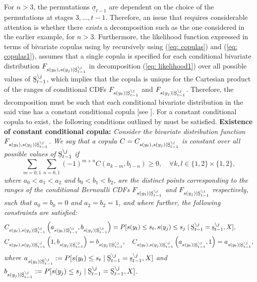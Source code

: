 \documentclass[harvard,11pt]{article}
\begin{document}
For $n>3$, the permutations $\underline{\sigma}_{t-1}$ are dependent on the choice of the permutations at stages $3,...,t-1$. Therefore, an issue that requires considerable attention is whether there \textit{exists} a decomposition such as the one considered in the earlier example, for $n>3$. Furthermore, the likelihood function expressed in terms of bivariate copulas using by recursively using (\ref{eq: copulas}) and (\ref{eq: copulas1}), assumes that a single copula is specified for each conditional bivariate distribution $F_{s(y_t),s(y_j)\mid \text{\b{S}}_{t-1}^{\backslash j}}$ in decomposition (\ref{eq: likelihood1}) over all possible values of $\text{\b{S}}_{t-1}^{\backslash j}$, which implies that the copula is unique for the Cartesian product of the ranges of conditional CDFs $F_{s(y_t)\mid \text{\b{S}}_{t-1}^{\backslash j}}$ and $F_{s(y_j)\mid \text{\b{S}}_{t-1}^{\backslash j}}$. Therefore, the decomposition must be such that each conditional bivariate distribution in the said vine has a constant conditional copula [see \citet{panagiotelis2012pair}]. For a constant conditional copula to exist, the following conditions outlined by \citet{panagiotelis2012pair} must be satisfied.
\newline
\noindent\textbf{Existence of constant conditional copula:} \textit{Consider the bivariate distribution function $F_{s(y_t),s(y_j)\mid \text{\b{S}}_{t-1}^{\backslash j}}$. We say that a copula $C=C_{s(y_t),s(y_j)\mid\text{\b{S}}_{t-1}^{\backslash j}}$ is constant over all possible values of $\text{\b{S}}_{t-1}^{\backslash j}$ if}
\[
\sum\limits_{m=0,1}\sum\limits_{n=0,1}(-1)^{m+n}C(a_{k-m},b_{l-n})\geq 0,\quad \forall k,l\in\{1,2\}\times\{1,2\},
\] 
\textit{where $a_0<a_1<a_2$ and $b_0<b_1<b_2$, are the distinct points corresponding to the ranges of the conditional Bernoulli CDFs $F_{s(y_t)\mid \text{\b{S}}_{t-1}^{\backslash j}}$ and $F_{s(y_j)\mid \text{\b{S}}_{t-1}^{\backslash j}}$ respectively, such that $a_0=b_0=0$ and $a_{2}=b_{2}=1$, and where further, the following constraints are satisfied:}
\begingroup
\allowdisplaybreaks
\begin{align*}
&C_{s(y_t),s(y_j)\mid \text{\b{S}}_{t-1}^{\backslash j}}\left(a_{s(y_t)\mid\text{\b{S}}_{t-1}^{\backslash j}},b_{s(y_j)\mid\text{\b{S}}_{t-1}^{\backslash j}}\right)=P[s(y_t)\leq s_t,s(y_j)\leq s_j\mid \text{\b{S}}_{t-1}^{\backslash j}=\text{\b{s}}_{t-1}^{\backslash j},X],\\
&C_{s(y_t),s(y_j)\mid  \text{\b{S}}_{t-1}^{\backslash j}}\left(1,b_{s(y_j)\mid\text{\b{S}}_{t-1}^{\backslash j}}\right)=b_{s(y_j)\mid\text{\b{S}}_{t-1}^{\backslash j}},\quad C_{s(y_t),s(y_j)\mid  \text{\b{S}}_{t-1}^{\backslash j}}\left(a_{s(y_t)\mid\text{\b{S}}_{t-1}^{\backslash j}},1\right)=a_{s(y_t)\mid\text{\b{S}}_{t-1}^{\backslash j}},
\end{align*}
\endgroup
\textit{where $a_{s(y_t)\mid\text{\b{S}}_{t-1}^{\backslash j}}:=P[s(y_t)\leq s_t\mid \text{\b{S}}_{t-1}^{\backslash j}=\text{\b{s}}_{t-1}^{\backslash j},X]$ and $b_{s(y_j)\mid\text{\b{S}}_{t-1}^{\backslash j}}:=P[s(y_j)\leq s_j\mid \text{\b{S}}_{t-1}^{\backslash j}=\text{\b{S}}_{t-1}^{\backslash j},X]$.}
\end{document}

